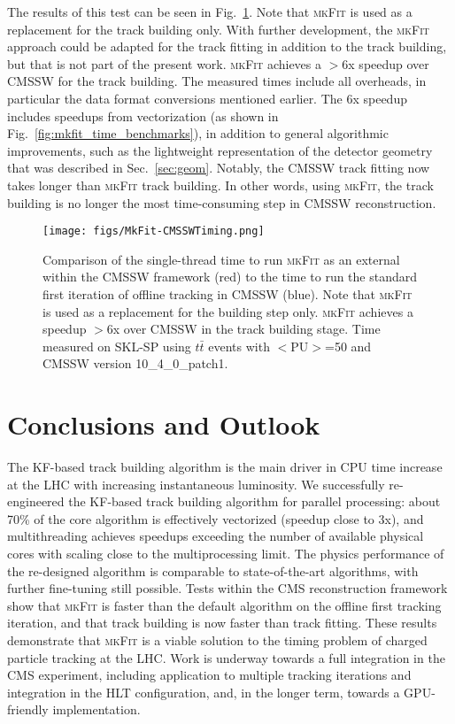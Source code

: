 \documentclass[a4paper,11pt]{article}
\newcommand{\ttbar}{\ensuremath{t\bar{t}}\xspace}
\newcommand{\mkFit}{\textsc{mkFit}\xspace}
\begin{document}
The results of this test can be seen in Fig.~\ref{fig:mkfit_vs_cmssw}. Note that \mkFit is used as a replacement for the track building only. With further development, the \mkFit approach could be adapted for the track fitting in addition to the track building, but that is not part of the present work.
\mkFit achieves a $>$6x speedup over CMSSW for the track building. 
The measured times include all overheads, in particular the data format conversions mentioned earlier. 
The 6x speedup includes speedups from vectorization (as shown in Fig.~\ref{fig:mkfit_time_benchmarks}), in addition to 
general algorithmic improvements, such as the 
lightweight representation of the detector geometry that was described in Sec.~\ref{sec:geom}.
Notably, the CMSSW track fitting now takes longer than \mkFit track building. 
In other words, using \mkFit, the track building is no longer the most time-consuming step in CMSSW reconstruction. 


\begin{figure}[htbp]
  \begin{center}
    \texttt{[image: figs/MkFit-CMSSWTiming.png]}
    \caption{Comparison of the single-thread time to run \mkFit as an external within the CMSSW 
      framework (red) to the time to run the standard first iteration of offline tracking in CMSSW (blue). Note that \mkFit is used as a replacement for the building step only. \mkFit 
      achieves a speedup $>$6x over CMSSW in the track building stage. Time measured on SKL-SP using \ttbar events with $<$PU$>$=50 and CMSSW version 10\_4\_0\_patch1.}
    \label{fig:mkfit_vs_cmssw}
  \end{center}
\end{figure}



\section{Conclusions and Outlook}
\label{sec:outlook}

The KF-based track building algorithm is the main driver in CPU time increase at the LHC with increasing instantaneous luminosity. We successfully re-engineered the KF-based track building algorithm for parallel processing: about 70\% of the core algorithm is effectively vectorized (speedup close to 3x), and multithreading achieves speedups exceeding the number of available physical cores with scaling close to the multiprocessing limit. The physics performance of the re-designed algorithm is comparable to state-of-the-art algorithms, with further fine-tuning still possible. Tests within the CMS reconstruction framework show that \mkFit is faster than the default algorithm on the offline first tracking iteration, and that track building is now faster than track fitting. These results demonstrate that \mkFit is a viable solution to the timing problem of charged particle tracking at the LHC. Work is underway towards a full integration in the CMS experiment, including application to multiple tracking iterations and integration in the HLT configuration, and, in the longer term, towards a GPU-friendly implementation.
\end{document}
